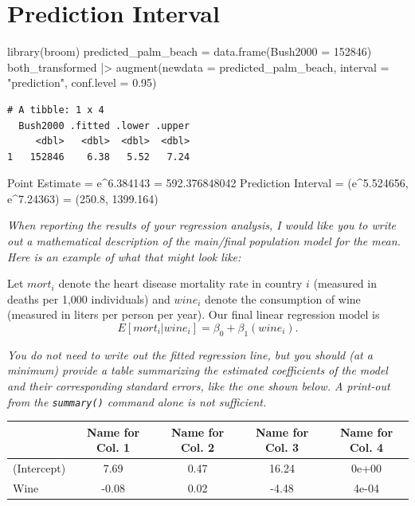 \documentclass[
  letterpaper,
  DIV=11,
  numbers=noendperiod]{scrartcl}
\newenvironment{Shaded}{\begin{snugshade}}{\end{snugshade}}
\newcommand{\AttributeTok}[1]{\textcolor[rgb]{0.40,0.45,0.13}{#1}}
\newcommand{\DecValTok}[1]{\textcolor[rgb]{0.68,0.00,0.00}{#1}}
\newcommand{\FloatTok}[1]{\textcolor[rgb]{0.68,0.00,0.00}{#1}}
\newcommand{\FunctionTok}[1]{\textcolor[rgb]{0.28,0.35,0.67}{#1}}
\newcommand{\NormalTok}[1]{\textcolor[rgb]{0.00,0.23,0.31}{#1}}
\newcommand{\OtherTok}[1]{\textcolor[rgb]{0.00,0.23,0.31}{#1}}
\newcommand{\SpecialCharTok}[1]{\textcolor[rgb]{0.37,0.37,0.37}{#1}}
\newcommand{\StringTok}[1]{\textcolor[rgb]{0.13,0.47,0.30}{#1}}
\begin{document}
\hypertarget{prediction-interval}{%
\section{Prediction Interval}\label{prediction-interval}}

\begin{Shaded}
\begin{Highlighting}[]
\FunctionTok{library}\NormalTok{(broom)}
\NormalTok{predicted\_palm\_beach }\OtherTok{=} \FunctionTok{data.frame}\NormalTok{(}\AttributeTok{Bush2000 =} \DecValTok{152846}\NormalTok{)}
\NormalTok{both\_transformed }\SpecialCharTok{|\textgreater{}} \FunctionTok{augment}\NormalTok{(}\AttributeTok{newdata =}\NormalTok{ predicted\_palm\_beach, }\AttributeTok{interval =} \StringTok{"prediction"}\NormalTok{, }\AttributeTok{conf.level =} \FloatTok{0.95}\NormalTok{)}
\end{Highlighting}
\end{Shaded}

\begin{verbatim}
# A tibble: 1 x 4
  Bush2000 .fitted .lower .upper
     <dbl>   <dbl>  <dbl>  <dbl>
1   152846    6.38   5.52   7.24
\end{verbatim}

Point Estimate = e\^{}6.384143 = 592.376848042 Prediction Interval =
(e\^{}5.524656, e\^{}7.24363) = (250.8, 1399.164)

\emph{When reporting the results of your regression analysis, I would
like you to write out a mathematical description of the main/final
population model for the mean. Here is an example of what that might
look like:}

Let \(mort_i\) denote the heart disease mortality rate in country \(i\)
(measured in deaths per 1,000 individuals) and \(wine_i\) denote the
consumption of wine (measured in liters per person per year). Our final
linear regression model is
\[E[mort_i | wine_i] = \beta_0 + \beta_1\left(wine_i\right).\]

\emph{You do not need to write out the fitted regression line, but you
should (at a minimum) provide a table summarizing the estimated
coefficients of the model and their corresponding standard errors, like
the one shown below. A print-out from the \texttt{summary()} command
alone is not sufficient.}

\begin{table}[H]
\centering
\begin{tabular}[t]{lcccc}
\toprule
  & Name for Col. 1 & Name for Col. 2 & Name for Col. 3 & Name for Col. 4\\
\midrule
(Intercept) & 7.69 & 0.47 & 16.24 & 0e+00\\
Wine & -0.08 & 0.02 & -4.48 & 4e-04\\
\bottomrule
\end{tabular}
\end{table}
\end{document}
